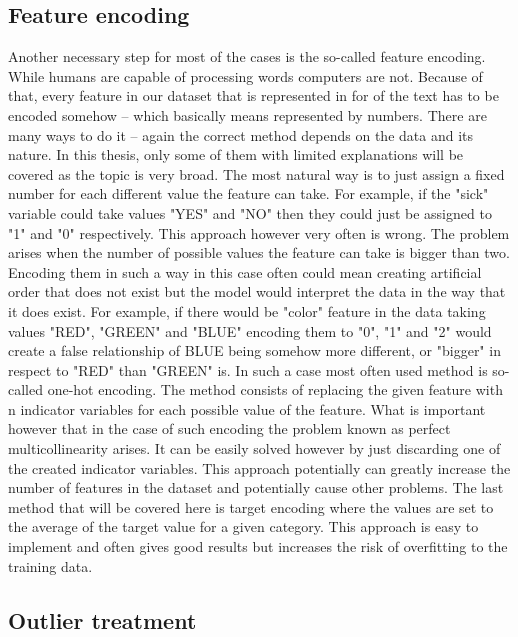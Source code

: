 \documentclass[a4paper,twoside,12pt]{book}
\begin{document}
\subsection{Feature encoding}

Another necessary step for most of the cases is the so-called feature encoding. While humans are capable of processing words computers are not. Because of that, every feature in our dataset that is represented in for of the text has to be encoded somehow -- which basically means represented by numbers.
There are many ways to do it -- again the correct method depends on the data and its nature. 
In this thesis, only some of them with limited explanations will be covered as the topic is very broad.
The most natural way is to just assign a fixed number for each different value the feature can take. For example, if the "sick" variable could take values "YES" and "NO" then they could just be assigned to "1" and "0" respectively. This approach however very often is wrong. The problem arises when the number of possible values the feature can take is bigger than two. Encoding them in such a way in this case often could mean creating artificial order that does not exist but the model would interpret the data in the way that it does exist. For example, if there would be "color" feature in the data taking values "RED", "GREEN" and "BLUE" encoding them to "0", "1" and "2" would create a false relationship of BLUE being somehow more different, or "bigger" in respect to "RED" than "GREEN" is.
In such a case most often used method is so-called one-hot encoding. 
The method consists of replacing the given feature with n indicator variables for each possible value of the feature. What is important however that in the case of such encoding the problem known as perfect multicollinearity \cite{alin2010multicollinearity} arises. It can be easily solved however by just discarding one of the created indicator variables. This approach potentially can greatly increase the number of features in the dataset and potentially cause other problems.
The last method that will be covered here is target encoding where the values are set to the average of the target value for a given category. This approach is easy to implement and often gives good results but increases the risk of overfitting to the training data.

\subsection{Outlier treatment}
\end{document}

